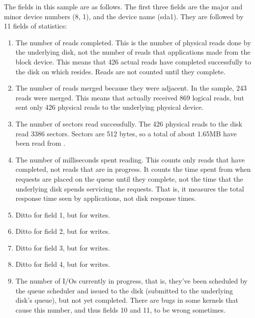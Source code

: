 \documentclass[letterpaper,10pt,english]{sphinxmanual}
\begin{document}
\sphinxAtStartPar
The fields in this sample are as follows.  The first three fields are the major
and minor device numbers (8, 1), and the device name (sda1). They are followed
by 11 fields of statistics:
\begin{enumerate}
%
\item {} 
\sphinxAtStartPar
The number of reads completed.  This is the number of physical reads done by the
underlying disk, not the number of reads that applications made from the block
device.  This means that 426 actual reads have completed successfully to the
disk on which  resides.  Reads are not counted until they complete.

\item {} 
\sphinxAtStartPar
The number of reads merged because they were adjacent.  In the sample, 243 reads
were merged. This means that  actually received 869 logical reads,
but sent only 426 physical reads to the underlying physical device.

\item {} 
\sphinxAtStartPar
The number of sectors read successfully.  The 426 physical reads to the disk
read 3386 sectors.  Sectors are 512 bytes, so a total of about 1.65MB have been
read from .

\item {} 
\sphinxAtStartPar
The number of milliseconds spent reading.  This counts only reads that have
completed, not reads that are in progress.  It counts the time spent from when
requests are placed on the queue until they complete, not the time that the
underlying disk spends servicing the requests. That is, it measures the total
response time seen by applications, not disk response times.

\item {} 
\sphinxAtStartPar
Ditto for field 1, but for writes.

\item {} 
\sphinxAtStartPar
Ditto for field 2, but for writes.

\item {} 
\sphinxAtStartPar
Ditto for field 3, but for writes.

\item {} 
\sphinxAtStartPar
Ditto for field 4, but for writes.

\item {} 
\sphinxAtStartPar
The number of I/Os currently in progress, that is, they’ve been scheduled by the
queue scheduler and issued to the disk (submitted to the underlying disk’s
queue), but not yet completed.  There are bugs in some kernels that cause this
number, and thus fields 10 and 11, to be wrong sometimes.


\end{enumerate}
\end{document}
